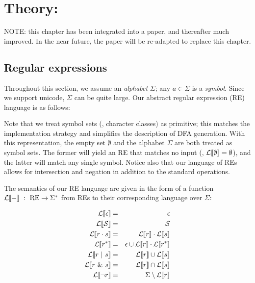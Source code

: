\chapter[\ulex]{Theory: \ulex}\label{sec:theory}

{\Large NOTE: this chapter has been integrated into a paper, and thereafter much improved.  In the near future, the paper will be re-adapted to replace this chapter.}

\section{Regular expressions}

Throughout this section, we assume an \emph{alphabet} $\Sigma$; any $a \in \Sigma$ is a \emph{symbol}.  Since we support unicode, $\Sigma$ can be quite large.  Our abstract regular expression (RE) language is as follows:


Note that we treat symbol sets (\ie{}, character classes) as primitive; this matches the implementation strategy and simplifies the description of DFA generation.  With this representation, the empty set $\emptyset$ and the alphabet $\Sigma$ are both treated as symbol sets.  The former will yield an RE that matches no input (\ie{}, $\mathcal{L}[ \! [ \emptyset ] \! ] = \emptyset$), and the latter will match any single symbol.  Notice also that our language of REs allows for intersection and negation in addition to the standard operations.

The semantics of our RE language are given in the form of a function $\mathcal{L}[ \! [ - ] \! ] \ : \ \mathrm{RE} \rightarrow \Sigma^*$ from REs to their corresponding language over $\Sigma$:

\begin{eqnarray*}
\Ls{\epsilon} 	&=& 	\epsilon \\
\Ls{\CS}		&=& 	\CS \\
\Ls{r\cdot s}	&=& 	\Ls{r} \cdot \Ls{s} \\
\Ls{r^*}		&=& 	\epsilon \cup \Ls{r}\cdot\Ls{r^*} \\
\Ls{r \OR s}	&=&		\Ls{r} \cup \Ls{s} \\
\Ls{r \AND s}	&=& 	\Ls{r} \cap \Ls{s} \\
\Ls{\neg r}		&=& 	\Sigma \setminus \Ls{r}
\end{eqnarray*}

